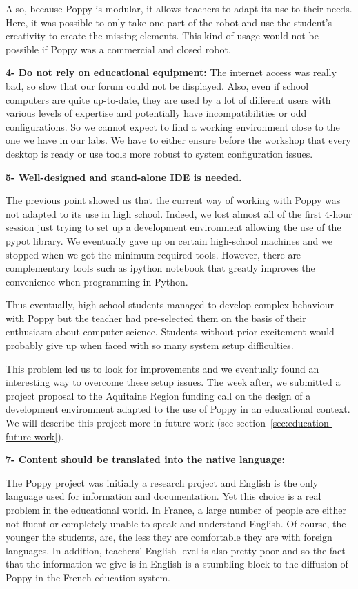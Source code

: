 Also, because Poppy is modular, it allows teachers to adapt its use to their needs. Here, it was possible to only take one part of the robot and use the student’s creativity to create the missing elements. This kind of usage would not be possible if Poppy was a commercial and closed robot.

\textbf{4- Do not rely on educational equipment:}
The internet access was really bad, so slow that our forum could not be displayed. Also, even if school computers are quite up-to-date, they are used by a lot of different users with various levels of expertise and potentially have incompatibilities or odd configurations. So we cannot expect to find a working environment close to the one we have in our labs.
We have to either ensure before the workshop that every desktop is ready or use tools more robust to system configuration issues.

\textbf{5- Well-designed and stand-alone IDE is needed.}

The previous point showed us that the current way of working with Poppy was not adapted to its use in high school. Indeed, we lost almost all of the first 4-hour session just trying to set up a development environment allowing the use of the pypot library. We eventually gave up on certain high-school machines and we stopped when we got the minimum required tools. However, there are complementary tools such as ipython notebook that greatly improves the convenience when programming in Python.

Thus eventually, high-school students managed to develop complex behaviour with Poppy but the teacher had pre-selected them on the basis of their enthusiasm about computer science. Students without prior excitement would probably give up when faced with so many system setup difficulties.

This problem led us to look for improvements and we eventually found an interesting way to overcome these setup issues. The week after, we submitted a project proposal to the Aquitaine Region funding call on the design of a development environment adapted to the use of Poppy in an educational context. We will describe this project more in future work (see section~\ref{sec:education-future-work}).


\textbf{7- Content should be translated into the native language:}

The Poppy project was initially a research project and English is the only language used for information and documentation. Yet this choice is a real problem in the educational world. In France, a large number of people are either not fluent or completely unable to speak and understand English. Of course, the younger the students,  are, the less they are comfortable they are with foreign languages. In addition, teachers’ English level is also pretty poor and so the fact that the information we give is in English is a stumbling block to the diffusion of Poppy in the French education system.



